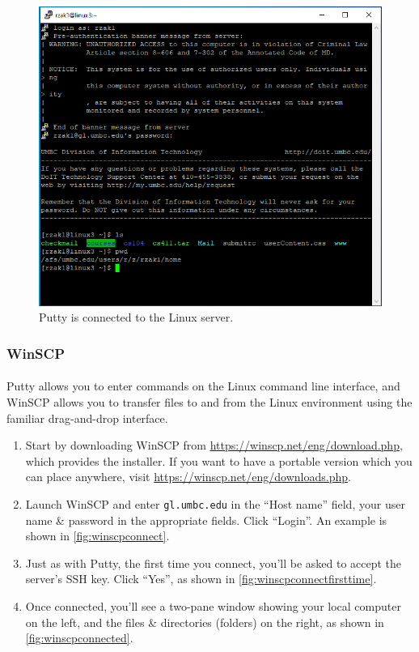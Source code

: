 \documentclass[letter,11pt]{article}
\begin{document}
\begin{figure}
\centering
\includegraphics[scale=0.7]{Images/putty_connected.png}
\caption{Putty is connected to the Linux server.}
\label{fig:puttyconnected}
\end{figure}

\FloatBarrier
\subsubsection{WinSCP}
\paragraph{}Putty allows you to enter commands on the Linux command line interface, and WinSCP allows you to transfer files to and from the Linux environment using the familiar drag-and-drop interface.

\begin{enumerate}
    \item Start by downloading WinSCP from \url{https://winscp.net/eng/download.php}, which provides the installer. If you want to have a portable version which you can place anywhere, visit \url{https://winscp.net/eng/downloads.php}.
    \item Launch WinSCP and enter \texttt{gl.umbc.edu} in the ``Host name'' field, your user name \& password in the appropriate fields. Click ``Login''. An example is shown in \autoref{fig:winscpconnect}.
    \item Just as with Putty, the first time you connect, you'll be asked to accept the server's SSH key. Click ``Yes'', as shown in \autoref{fig:winscpconnectfirsttime}.
    \item Once connected, you'll see a two-pane window showing your local computer on the left, and the files \& directories (folders) on the right, as shown in \autoref{fig:winscpconnected}.
\end{enumerate}
\end{document}
